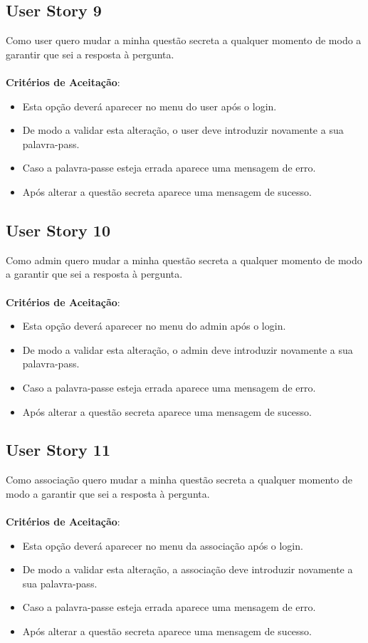 \documentclass[a4paper,11pt]{article}
\begin{document}
\subsection{User Story 9}
Como user quero mudar a minha questão secreta a qualquer momento de modo a garantir que sei a resposta à pergunta.\\\\
\textbf{Critérios de Aceitação}:
\begin{itemize}
  \item Esta opção deverá aparecer no menu do user após o login.
  \item De modo a validar esta alteração, o user deve introduzir novamente a sua palavra-pass.
  \item Caso a palavra-passe esteja errada aparece uma mensagem de erro.
  \item Após alterar a questão secreta aparece uma mensagem de sucesso.
\end{itemize}

\subsection{User Story 10}
Como admin quero mudar a minha questão secreta a qualquer momento de modo a garantir que sei a resposta à pergunta.\\\\
\textbf{Critérios de Aceitação}:
\begin{itemize}
  \item Esta opção deverá aparecer no menu do admin após o login.
  \item De modo a validar esta alteração, o admin deve introduzir novamente a sua palavra-pass.
  \item Caso a palavra-passe esteja errada aparece uma mensagem de erro.
  \item Após alterar a questão secreta aparece uma mensagem de sucesso.
\end{itemize}

\subsection{User Story 11}
Como associação quero mudar a minha questão secreta a qualquer momento de modo a garantir que sei a resposta à pergunta.\\\\
\textbf{Critérios de Aceitação}:
\begin{itemize}
  \item Esta opção deverá aparecer no menu da associação após o login.
  \item De modo a validar esta alteração, a associação deve introduzir novamente a sua palavra-pass.
  \item Caso a palavra-passe esteja errada aparece uma mensagem de erro.
  \item Após alterar a questão secreta aparece uma mensagem de sucesso.
\end{itemize}
\end{document}

